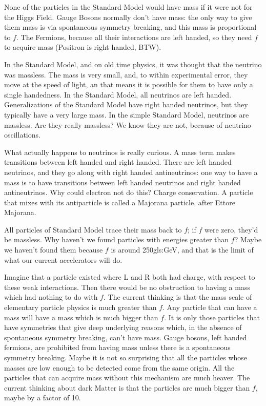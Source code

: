 \documentclass[]{article}
\begin{document}
None of the particles in the Standard Model would have mass if it were not for the Higgs Field. Gauge Bosons normally don't have mass: the only way to give them mass is via spontaneous symmetry breaking, and this mass is proportional to $f$. The Fermions, because all their interactions are left handed, so they need $f$ to acquire mass (Positron is right handed, BTW).

In the Standard Model, and on old time physics, it was thought that the neutrino was massless. The mass is very small, and, to within experimental error, they move at the speed of light, an that means it is possible for them to have only a single handedness. In the Standard Model, all neutrinos are left handed. Generalizations of the Standard Model have right handed neutrinos, but they typically have a very large mass. In the simple Standard Model, neutrinos are massless. Are they really massless? We know they are not, because of neutrino oscillations. 

What actually happens to neutrinos is really curious. A mass term makes transitions between left handed and right handed. There are left handed neutrinos, and they go along with right handed antineutrinos: one way to have a mass is to have transitions between left handed neutrinos and right handed antineutrinos. Why could electron not do this? Charge conservation. A particle that mixes with its antiparticle is called a Majorana particle, after Ettore Majorana.

All particles of Standard Model trace their mass back to $f$; if $f$ were zero, they'd be massless. Why haven't we found particles with energies greater than $f$? Maybe we haven't found them because $f$ is around 250\gls{gls:GeV}, and that is the limit of what our current accelerators will do.

Imagine that a particle existed where L and R both had charge, with respect to these weak interactions. Then there would be no obstruction to having a mass which had nothing to do with $f$. The current thinking is that the mass scale of elementary particle physics is much greater than $f$. Any particle that can have a mass will have a mass which is much bigger than $f$. It is only those particles that have symmetries that give deep underlying reasons which, in the absence of spontaneous symmetry breaking,  can't have mass. Gauge bosons, left handed fermions, are prohibited from having mass unless there is a spontaneous symmetry breaking. Maybe it is not so surprising that all the particles whose masses are low enough to be detected come from the same origin. All the particles that can acquire mass without this mechanism are much heaver. The current thinking about dark Matter is that the particles are much bigger than $f$, maybe by a factor of 10.
\end{document}
